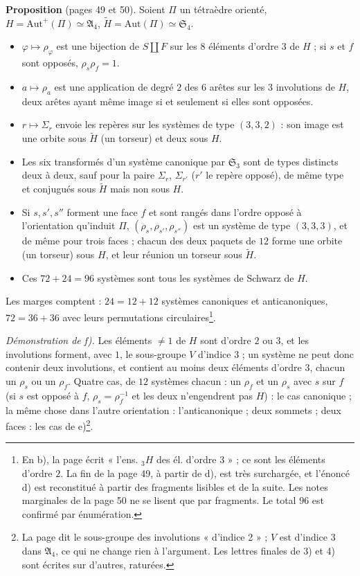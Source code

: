 \documentclass[11pt,a4paper]{article}
\begin{document}
\textbf{Proposition} (pages 49 et 50). Soient $\Pi$ un tétraèdre orienté, $H =
\mathrm{Aut}^+(\Pi) \simeq \mathfrak{A}_4$, $\widetilde H = \mathrm{Aut}(\Pi)
\simeq \mathfrak{S}_4$.
\begin{itemize}
  \item[a)] $\varphi \mapsto \rho_\varphi$ est une bijection de $S \amalg F$
    sur les $8$ éléments d'ordre $3$ de $H$ ; si $s$ et $f$ sont opposés,
    $\rho_s\rho_f = 1$.
  \item[b)] $a \mapsto \rho_a$ est une application de degré $2$ des $6$
    arêtes sur les $3$ involutions de $H$, deux arêtes ayant même image si et
    seulement si elles sont opposées.
  \item[c)] $r \mapsto \Sigma_r$ envoie les repères sur les systèmes de type
    $(3, 3, 2)$ : son image est une orbite sous $\widetilde H$ (un torseur) et
    deux sous $H$.
  \item[d)] Les six transformés d'un système canonique par $\mathfrak{S}_3$
    sont de types distincts deux à deux, sauf pour la paire $\Sigma_r$,
    $\Sigma_{r'}$ ($r'$ le repère opposé), de même type et conjugués sous
    $\widetilde H$ mais non sous $H$.
  \item[e)] Si $s, s', s''$ forment une face $f$ et sont rangés dans l'ordre
    opposé à l'orientation qu'induit $\Pi$, $(\rho_s, \rho_{s'}, \rho_{s''})$
    est un système de type $(3, 3, 3)$, et de même pour trois faces ;
    chacun des deux paquets de $12$ forme une orbite (un torseur) sous $H$, et
    leur réunion un torseur sous $\widetilde H$.
  \item[f)] Ces $72 + 24 = 96$ systèmes sont tous les systèmes de Schwarz de
    $H$.
\end{itemize}
Les marges comptent : $24 = 12 + 12$ systèmes canoniques et anticanoniques,
$72 = 36 + 36$ avec leurs permutations circulaires\footnote{En b), la page
écrit « l'ens. ${}_3H$ des él. d'ordre 3 » ; ce sont les éléments d'ordre $2$.
La fin de la page 49, à partir de d), est très surchargée, et l'énoncé d) est
reconstitué à partir des fragments lisibles et de la suite. Les notes
marginales de la page 50 ne se lisent que par fragments. Le total $96$ est
confirmé par énumération.}.

\emph{Démonstration de f).} Les éléments $\neq 1$ de $H$ sont d'ordre $2$ ou
$3$, et les involutions forment, avec $1$, le sous-groupe $V$ d'indice $3$ ;
un système ne peut donc contenir deux involutions, et contient au moins deux
éléments d'ordre $3$, chacun un $\rho_s$ ou un $\rho_f$. Quatre cas, de $12$
systèmes chacun : un $\rho_f$ et un $\rho_s$ avec $s$ sur $f$ (si $s$ est
opposé à $f$, $\rho_s = \rho_f^{-1}$ et les deux n'engendrent pas $H$) : le cas
canonique ; la même chose dans l'autre orientation : l'anticanonique ; deux
sommets ; deux faces : les cas de e)\footnote{La page dit le sous-groupe des
involutions « d'indice 2 » ; $V$ est d'indice $3$ dans $\mathfrak{A}_4$, ce qui
ne change rien à l'argument. Les lettres finales de 3) et 4) sont écrites sur
d'autres, raturées.}.
\end{document}
